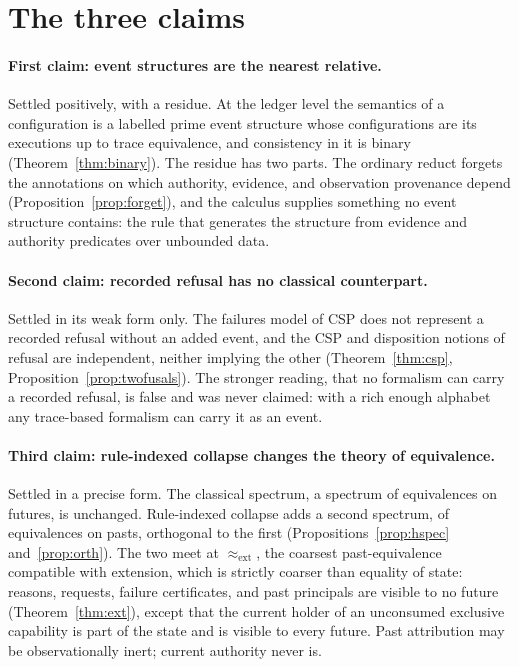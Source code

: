 \documentclass[11pt,openany]{book}
\theoremstyle{remark}
\begin{document}
\section{The three claims}

\paragraph{First claim: event structures are the nearest relative.}
Settled positively, with a residue. At the ledger level the semantics of a
configuration is a labelled prime event structure whose configurations
are its executions up to trace equivalence, and consistency in it is
binary (Theorem~\ref{thm:binary}). The residue has two parts. The ordinary
reduct forgets the annotations on which authority, evidence, and
observation provenance depend (Proposition~\ref{prop:forget}), and the
calculus supplies something no event structure contains: the rule that
generates the structure from evidence and authority predicates over
unbounded data.

\paragraph{Second claim: recorded refusal has no classical counterpart.}
Settled in its weak form only. The failures model of CSP does not
represent a recorded refusal without an added event, and the CSP and
disposition notions of refusal are independent, neither implying the
other (Theorem~\ref{thm:csp}, Proposition~\ref{prop:twofusals}). The
stronger reading, that no formalism can carry a recorded refusal, is
false and was never claimed: with a rich enough alphabet any
trace-based formalism can carry it as an event.

\paragraph{Third claim: rule-indexed collapse changes the theory of
equivalence.} Settled in a precise form. The classical spectrum, a
spectrum of equivalences on futures, is unchanged. Rule-indexed collapse
adds a second spectrum, of equivalences on pasts, orthogonal to the first
(Propositions~\ref{prop:hspec} and~\ref{prop:orth}). The two meet at
$\approx_{\mathrm{ext}}$, the coarsest past-equivalence compatible with
extension, which is strictly coarser than equality of state: reasons,
requests, failure certificates, and past principals are visible to no
future (Theorem~\ref{thm:ext}), except that the current holder of an
unconsumed exclusive capability is part of the state and is visible to
every future. Past attribution may be observationally inert; current
authority never is.
\end{document}
